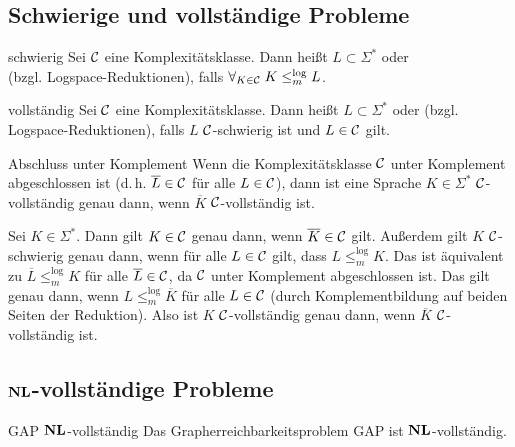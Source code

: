 \pagebreak

\subsection{%
    Schwierige und vollständige Probleme%
}

\begin{Def}{schwierig}
    Sei $\mathcal{C}$ eine Komplexitätsklasse.
    Dann heißt $L \subset \Sigma^\ast$  oder\\
     (bzgl. Logspace-Reduktionen),
    falls $\forall_{K \in \mathcal{C}}\; K \le_m^{\log} L$.
\end{Def}

\begin{Def}{vollständig}
    Sei $\mathcal{C}$ eine Komplexitätsklasse.
    Dann heißt $L \subset \Sigma^\ast$  oder
     (bzgl. Logspace-Reduktionen),
    falls $L$ $\mathcal{C}$-schwierig ist und $L \in \mathcal{C}$ gilt.
\end{Def}

\linie

\begin{Satz}{Abschluss unter Komplement}
    Wenn die Komplexitätsklasse $\mathcal{C}$ unter Komplement abgeschlossen ist
    (d.\,h. $\overline{L} \in \mathcal{C}$ für alle $L \in \mathcal{C}$),
    dann ist eine Sprache $K \in \Sigma^\ast$ $\mathcal{C}$-vollständig genau dann,
    wenn $\overline{K}$ $\mathcal{C}$-vollständig ist.
\end{Satz}

\begin{Beweis}
    Sei $K \in \Sigma^\ast$.
    Dann gilt $K \in \mathcal{C}$ genau dann, wenn $\overline{K} \in \mathcal{C}$ gilt.
    Außerdem gilt $K$ $\mathcal{C}$-schwierig genau dann, wenn für alle
    $L \in \mathcal{C}$ gilt, dass $L \le_m^{\log} K$.
    Das ist äquivalent zu $\overline{L} \le_m^{\log} K$ für alle $\overline{L} \in \mathcal{C}$,
    da $\mathcal{C}$ unter Komplement abgeschlossen ist.
    Das gilt genau dann, wenn $L \le_m^{\log} \overline{K}$ für alle $L \in \mathcal{C}$
    (durch Komplementbildung auf beiden Seiten der Reduktion).
    Also ist $K$ $\mathcal{C}$-vollständig genau dann, wenn $\overline{K}$
    $\mathcal{C}$-vollständig ist.
\end{Beweis}

\subsection{%
    \texorpdfstring{$\mathbf{NL}$}{NL}-vollständige Probleme%
}

\begin{Satz}{GAP $\mathbf{NL}$-vollständig}
    Das Grapherreichbarkeitsproblem GAP ist $\mathbf{NL}$-vollständig.
\end{Satz}

